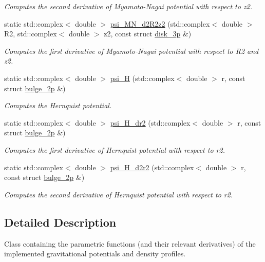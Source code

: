 \begin{DoxyCompactItemize}
\begin{DoxyCompactList}\small\item\em Computes the second derivative of Myamoto-\/\+Nagai potential with respect to z2. \end{DoxyCompactList}\item 
static std\+::complex$<$ double $>$ \hyperlink{classParametric__funcs_a92016aa86c23afb7aaa99f0bdf466962}{psi\+\_\+\+M\+N\+\_\+d2\+R2z2} (std\+::complex$<$ double $>$ R2, std\+::complex$<$ double $>$ z2, const struct \hyperlink{structdisk__3p}{disk\+\_\+3p} \&)
\begin{DoxyCompactList}\small\item\em Computes the first derivative of Myamoto-\/\+Nagai potential with respect to R2 and z2. \end{DoxyCompactList}\item 
static std\+::complex$<$ double $>$ \hyperlink{classParametric__funcs_a4ef64b9bbc8c109f4e3986bb425342f3}{psi\+\_\+H} (std\+::complex$<$ double $>$ r, const struct \hyperlink{structbulge__2p}{bulge\+\_\+2p} \&)
\begin{DoxyCompactList}\small\item\em Computes the Hernquist potential. \end{DoxyCompactList}\item 
static std\+::complex$<$ double $>$ \hyperlink{classParametric__funcs_ab02a5302fd6db1539e4a29d430370380}{psi\+\_\+\+H\+\_\+dr2} (std\+::complex$<$ double $>$ r, const struct \hyperlink{structbulge__2p}{bulge\+\_\+2p} \&)
\begin{DoxyCompactList}\small\item\em Computes the first derivative of Hernquist potential with respect to r2. \end{DoxyCompactList}\item 
static std\+::complex$<$ double $>$ \hyperlink{classParametric__funcs_a8e663fb60e664f232a5779dc107782a6}{psi\+\_\+\+H\+\_\+d2r2} (std\+::complex$<$ double $>$ r, const struct \hyperlink{structbulge__2p}{bulge\+\_\+2p} \&)
\begin{DoxyCompactList}\small\item\em Computes the second derivative of Hernquist potential with respect to r2. \end{DoxyCompactList}\end{DoxyCompactItemize}


\subsection{Detailed Description}
Class containing the parametric functions (and their relevant derivatives) of the implemented gravitational potentials and density profiles. 

